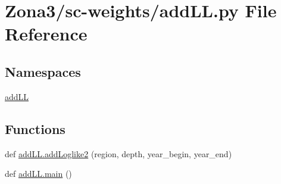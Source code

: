 \hypertarget{_zona3_2sc-weights_2add_l_l_8py}{}\section{Zona3/sc-\/weights/add\+LL.py File Reference}
\label{_zona3_2sc-weights_2add_l_l_8py}
\subsection*{Namespaces}
\begin{DoxyCompactItemize}
\item 
 \hyperlink{namespaceadd_l_l}{add\+LL}
\end{DoxyCompactItemize}
\subsection*{Functions}
\begin{DoxyCompactItemize}
\item 
def \hyperlink{namespaceadd_l_l_aa96a722d0234136b34ff4a5e5cd181d0}{add\+L\+L.\+add\+Loglike2} (region, depth, year\+\_\+begin, year\+\_\+end)
\item 
def \hyperlink{namespaceadd_l_l_a81cabc4a4a81cb2c54417df2d6eedb3a}{add\+L\+L.\+main} ()
\end{DoxyCompactItemize}
